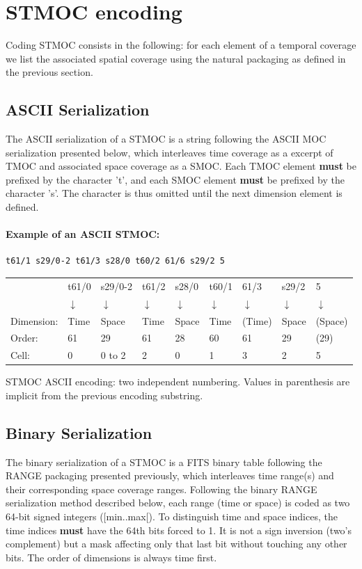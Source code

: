 \documentclass[11pt,a4paper]{ivoa}
\begin{document}
\section{STMOC encoding}
\label{sec:stmoc}
Coding STMOC consists in the following: for each element of a
temporal coverage we list the associated spatial coverage using the
natural packaging as defined in the previous section. 

\subsection{ASCII Serialization}
The ASCII serialization of a STMOC is a string following the ASCII MOC
serialization presented below, which interleaves time coverage as a
excerpt of TMOC and associated space coverage as a SMOC. Each TMOC
element {\bf must} be prefixed by the character 't', and each SMOC
element {\bf must} be prefixed by the character 's'.
The character is thus omitted until the next dimension element is
defined.

\paragraph{Example of an ASCII STMOC:}
\begin{lstlisting}[]
  t61/1 s29/0-2 t61/3 s28/0 t60/2 61/6 s29/2 5
\end{lstlisting}

\begin{center}
{\small
  \begin{tabular} { l l l l l l l l l }
   & t61/0      & s29/0-2    & t61/2      & s28/0 & t60/1 & 61/3 & s29/2 & 5\\
   & $\downarrow$ & $\downarrow$ & $\downarrow$ & $\downarrow$ & $\downarrow$ & $\downarrow$ & $\downarrow$ & $\downarrow$ \\
Dimension: & Time & Space  & Time  & Space & Time  & (Time) & Space & (Space) \\
Order:     & 61   & 29     & 61    & 28    & 60    & 61     &  29   & (29)\\
Cell:      & 0    & 0 to 2 & 2     & 0     & 1     & 3      &  2    & 5 \\
\end{tabular}}
STMOC ASCII encoding: two independent numbering. Values in parenthesis are implicit from the previous encoding substring.
\end{center}

\subsection{Binary Serialization}
The binary serialization of a STMOC is a FITS binary table following
the RANGE packaging presented previously, which interleaves time range(s)
and their corresponding space coverage ranges. Following the binary
RANGE serialization method described below, each range (time or space)
is coded as two 64-bit signed integers ([min..max[). To distinguish time
and space indices, the time indices {\bf must} have the 64th bits forced
to 1. It is not a sign inversion (two's complement) but a mask affecting
only that last bit without touching any other bits.  The order of
dimensions is always time first.
\end{document}
